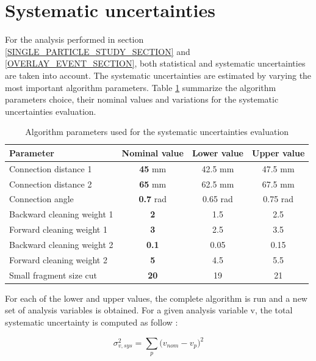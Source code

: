 \documentclass[cits]{JINST}
\begin{document}
\section{Systematic uncertainties}

For the analysis performed in section \ref{SINGLE_PARTICLE_STUDY_SECTION} and \ref{OVERLAY_EVENT_SECTION}, both statistical and systematic uncertainties are taken into account. The systematic uncertainties are estimated by varying the most important algorithm parameters. Table \ref{UNCERTAINTIES_ALGORITHM_TABLE} summarize the algorithm parameters choice, their nominal values and variations for the systematic uncertainties evaluation.

\begin{table}[!h]
  \begin{center}
     \begin{tabular}{|l|c|c|c|}
     \hline
     Parameter                  & Nominal value & Lower value & Upper value \\ \hline 
     Connection distance 1      & \textbf{45} mm   & 42.5 mm  & 47.5 mm \\ \hline
     Connection distance 2      & \textbf{65} mm   & 62.5 mm  & 67.5 mm \\ \hline
     Connection angle           & \textbf{0.7} rad & 0.65 rad & 0.75 rad \\ \hline
     Backward cleaning weight 1 & \textbf{2}       & 1.5      & 2.5  \\ \hline
     Forward  cleaning weight 1 & \textbf{3}       & 2.5      & 3.5  \\ \hline
     Backward cleaning weight 2 & \textbf{0.1}     & 0.05     & 0.15 \\ \hline
     Forward  cleaning weight 2 & \textbf{5}       & 4.5      & 5.5  \\ \hline
     Small fragment size cut    & \textbf{20}      & 19       & 21   \\ \hline
     \end{tabular}
     \caption{\label{UNCERTAINTIES_ALGORITHM_TABLE} Algorithm parameters used for the systematic uncertainties evaluation}
  \end{center}
\end{table}

For each of the lower and upper values, the complete algorithm is run and a new set of analysis variables is obtained. For a given analysis variable v, the total systematic uncertainty is computed as follow :

\begin{equation}
  \sigma_{v,sys}^2 = \sum\limits_{p} \big( v_{nom} - v_{p} \big)^2
\end{equation}
\end{document}
